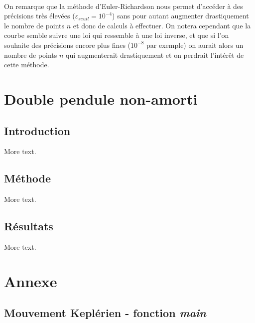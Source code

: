 \documentclass[11pt]{article} %
\begin{document}
\\ On remarque que la méthode d'Euler-Richardson nous permet d'accéder à des précisions très élevées ($\varepsilon_{seuil}=10^{-4}$) sans pour autant augmenter drastiquement le nombre de points $n$ et donc de calculs à effectuer. On notera cependant que la courbe semble suivre une loi qui ressemble à une loi inverse, et que si l'on souhaite des précisions encore plus fines ($10^{-8}$ par exemple) on aurait alors un nombre de points $n$ qui augmenterait drastiquement et on perdrait l'intérêt de cette méthode.



\clearpage
\section{Double pendule non-amorti}

\subsection{Introduction}

More text.

\subsection{Méthode}

More text.

\subsection{Résultats}

More text.

\clearpage
\section{Annexe}
\subsection{Mouvement Keplérien - fonction \textit{main}}

\end{document}
